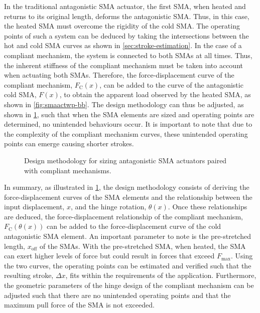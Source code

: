 In the traditional antagonistic SMA actuator, the first SMA, when heated and returns to its original length, deforms the antagonistic SMA. Thus, in this case, the heated SMA must overcome the rigidity of the cold SMA. The operating points of such a system can be deduced by taking the intersections between the hot and cold SMA curves as shown in \cref{sec:stroke-estimation}. In the case of a compliant mechanism, the system is connected to both SMAs at all times. Thus, the inherent stiffness of the compliant mechanism must be taken into account when actuating both SMAs. Therefore, the force-displacement curve of the compliant mechanism, $F_\mathrm{C}(x)$, can be added to the curve of the antagonistic cold SMA, $F(x)$, to obtain the apparent load observed by the heated SMA, as shown in \cref{fig:smaactwp-bb}. The design methodology can thus be adjusted, as shown in \cref{fig:flowchart-bb}, such that when the SMA elements are sized and operating points are determined, no unintended behaviours occur. It is important to note that due to the complexity of the compliant mechanism curves, these unintended operating points can emerge causing shorter strokes.

\begin{figure}[hbt!]
    \centering
    
    \caption{Design methodology for sizing antagonistic SMA actuators paired with compliant mechanisms.}
    \label{fig:flowchart-bb}
\end{figure}

In summary, as illustrated in \cref{fig:flowchart-bb}, the design methodology consists of deriving the force-displacement curves of the SMA elements and the relationship between the input displacement, $x$, and the hinge rotation, $\theta(x)$. Once these relationships are deduced, the force-displacement relationship of the compliant mechanism, $F_\mathrm{C}(\theta(x))$ can be added to the force-displacement curve of the cold antagonistic SMA element. An important parameter to note is the pre-stretched length, $x_\mathrm{off}$ of the SMAs. With the pre-stretched SMA, when heated, the SMA can exert higher levels of force but could result in forces that exceed $F_\mathrm{max}$. Using the two curves, the operating points can be estimated and verified such that the resulting stroke, $\Delta x$, fits within the requirements of the application. Furthermore, the geometric parameters of the hinge design of the compliant mechanism can be adjusted such that there are no unintended operating points and that the maximum pull force of the SMA is not exceeded.

